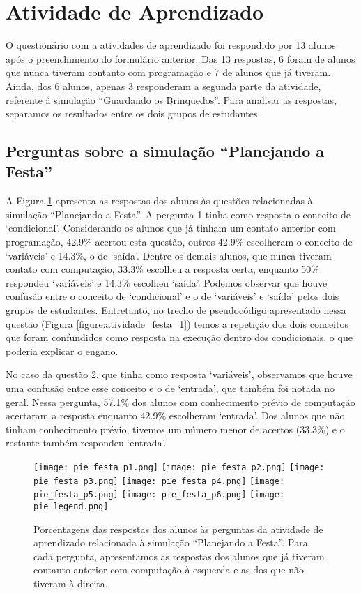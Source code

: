 \section{Atividade de Aprendizado}

O questionário com a atividades de aprendizado foi respondido por 13 alunos após o preenchimento do formulário anterior. Das 13 respostas, 6 foram de alunos que nunca tiveram contanto com programação e 7 de alunos que já tiveram. Ainda, dos 6 alunos, apenas 3 responderam a segunda parte da atividade, referente à simulação \enquote{Guardando os Brinquedos}. Para analisar as respostas, separamos os resultados entre os dois grupos de estudantes.

\subsection{Perguntas sobre a simulação \enquote{Planejando a Festa}}

A Figura \ref{figure:pies_festa} apresenta as respostas dos alunos às questões relacionadas à simulação \enquote{Planejando a Festa}. A pergunta 1 tinha como resposta o conceito de \enquote*{condicional}. Considerando os alunos que já tinham um contato anterior com programação, 42.9\% acertou esta questão, outros 42.9\% escolheram o conceito de \enquote*{variáveis} e 14.3\%, o de \enquote*{saída}. Dentre os demais alunos, que nunca tiveram contato com computação, 33.3\% escolheu a resposta certa, enquanto 50\% respondeu \enquote*{variáveis} e 14.3\% escolheu \enquote*{saída}. Podemos observar que houve confusão entre o conceito de \enquote*{condicional} e o de \enquote*{variáveis} e \enquote*{saída} pelos dois grupos de estudantes. Entretanto, no trecho de pseudocódigo apresentado nessa questão (Figura \ref{figure:atividade_festa_1}) temos a repetição dos dois conceitos que foram confundidos como resposta na execução dentro dos condicionais, o que poderia explicar o engano.

No caso da questão 2, que tinha como resposta \enquote*{variáveis}, observamos que houve uma confusão entre esse conceito e o de \enquote*{entrada}, que também foi notada no geral. Nessa pergunta, 57.1\% dos alunos com conhecimento prévio de computação acertaram a resposta enquanto 42.9\% escolheram \enquote*{entrada}. Dos alunos que não tinham conhecimento prévio, tivemos um número menor de acertos (33.3\%) e o restante também respondeu \enquote*{entrada}.

\begin{figure}[h!]
    \centering
    \texttt{[image: pie\_festa\_p1.png]}
    \texttt{[image: pie\_festa\_p2.png]}
    \texttt{[image: pie\_festa\_p3.png]}
    \texttt{[image: pie\_festa\_p4.png]}
    \texttt{[image: pie\_festa\_p5.png]}
    \texttt{[image: pie\_festa\_p6.png]}
    \texttt{[image: pie\_legend.png]}
    \caption{Porcentagens das respostas dos alunos às perguntas da atividade de aprendizado relacionada à simulação \enquote{Planejando a Festa}. Para cada pergunta, apresentamos as respostas dos alunos que já tiveram contanto anterior com computação à esquerda e as dos que não tiveram à direita.}
    \label{figure:pies_festa}
\end{figure}

